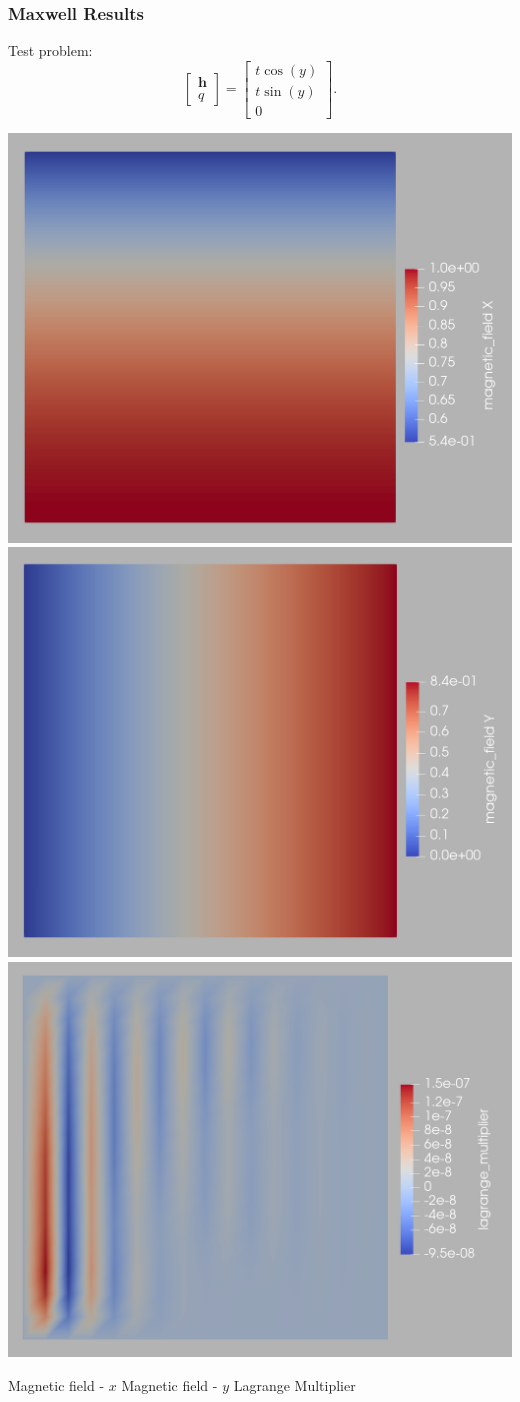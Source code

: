 \documentclass[mathserif]{beamer} %
\begin{document}
\begin{frame}
    \frametitle{Maxwell Results}
    Test problem: 
    \[ \begin{bmatrix} \boldsymbol{h} \\ q\end{bmatrix} = \begin{bmatrix} t \cos(y) \\ t \sin(y) \\ 0 \end{bmatrix}.\]
        \pause


        \includegraphics[width=.3\textwidth]{mag_x.png}
        \includegraphics[width=.3\textwidth]{mag_y.png}
        \includegraphics[width=.3\textwidth]{lagrange.png}

        Magnetic field - $x$ \hspace{.4cm} Magnetic field - $y$ \hspace{.4cm} Lagrange Multiplier
\end{frame}
\end{document}
